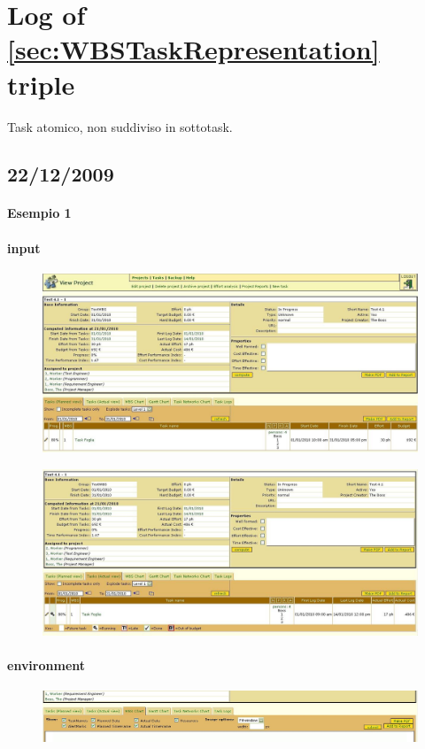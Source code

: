 \section{Log of \ref{sec:WBSTaskRepresentation} triple}

Task atomico, non suddiviso in sottotask.
\subsection{22/12/2009}
\paragraph{Esempio 1}
\paragraph{input}
\begin{figure}[h!]
\centering
\includegraphics[width=\textwidth]{tests/TEST_WBS/4.1/4.1_1/Esempio_1/input.png}
\end{figure}
\begin{figure}[h!]
\centering
\includegraphics[width=\textwidth]{tests/TEST_WBS/4.1/4.1_1/Esempio_1/input_actual.png}
\end{figure}
\newpage
\paragraph{environment}
\begin{figure}
\centering
\includegraphics[width=\textwidth]{tests/TEST_WBS/4.1/4.1_1/Esempio_1/environment.png}
\end{figure}
\newpage
